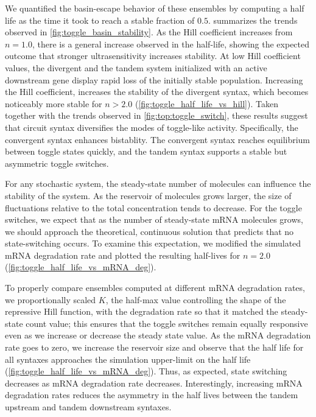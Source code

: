 \documentclass[11pt]{article}
\begin{document}
We quantified the basin-escape behavior of these ensembles by computing a half life as the time it took to reach a stable fraction of \(0.5\).  summarizes the trends observed in \cref{fig:toggle_basin_stability}. As the Hill coefficient increases from \(n = 1.0\), there is a general increase observed in the half-life, showing the expected outcome that stronger ultrasensitivity increases stability. At low Hill coefficient values, the divergent and the tandem system initialized with an active downstream gene display rapid loss of the initially stable population.  Increasing the Hill coefficient, increases the stability of the divergent syntax, which becomes noticeably more stable for \(n > 2.0\) (\cref{fig:toggle_half_life_vs_hill}). Taken together with the trends observed in \cref{fig:top:toggle_switch}, these results suggest that circuit syntax diversifies the modes of toggle-like activity. Specifically, the convergent syntax enhances bistablity. The convergent syntax reaches equilibrium between toggle states quickly, and the tandem syntax supports a stable but asymmetric toggle switches.


For any stochastic system, the steady-state number of molecules can influence the stability of the system. As the reservoir of molecules grows larger, the size of fluctuations relative to the total concentration tends to decrease. For the toggle switches, we expect that as the number of steady-state mRNA molecules grows, we should approach the theoretical, continuous solution that predicts that no state-switching occurs. To examine this expectation, we modified the simulated mRNA degradation rate and plotted the resulting half-lives for \(n = 2.0\) (\cref{fig:toggle_half_life_vs_mRNA_deg}).

To properly compare ensembles computed at different mRNA degradation rates, we proportionally scaled \(K\), the half-max value controlling the shape of the repressive Hill function, with the degradation rate so that it matched the steady-state count value; this ensures that the toggle switches remain equally responsive even as we increase or decrease the steady state value. As the mRNA degradation rate goes to zero, we increase the reservoir size and observe that the half life for all syntaxes approaches the simulation upper-limit on the half life (\cref{fig:toggle_half_life_vs_mRNA_deg}). Thus, as expected, state switching decreases as mRNA degradation rate decreases. Interestingly, increasing mRNA degradation rates reduces the asymmetry in the half lives between the tandem upstream and tandem downstream syntaxes.
\end{document}
